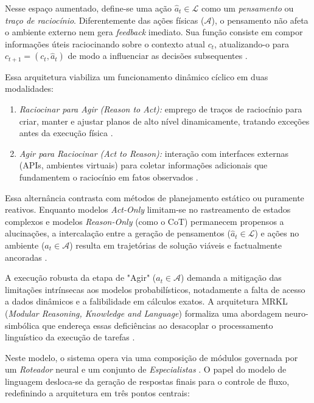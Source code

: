 \documentclass[
	12pt,				%
	openright,			%
	oneside,			%
	a4paper,			%
	dissertacao,			%
	]{ABNT-DC-UEL}
\begin{document}
Nesse espaço aumentado, define-se uma ação $\hat{a}_{t} \in \mathcal{L}$ como um \textit{pensamento} ou \textit{traço de raciocínio}. Diferentemente das ações físicas ($\mathcal{A}$), o pensamento não afeta o ambiente externo nem gera \textit{feedback} imediato. Sua função consiste em compor informações úteis raciocinando sobre o contexto atual $c_{t}$, atualizando-o para $c_{t+1} = (c_{t}, \hat{a}_{t})$ de modo a influenciar as decisões subsequentes \cite{yao2023}.

Essa arquitetura viabiliza um funcionamento dinâmico cíclico em duas modalidades:
\begin{enumerate}
  \item \textit{Raciocinar para Agir (Reason to Act):} emprego de traços de raciocínio para criar, manter e ajustar planos de alto nível dinamicamente, tratando exceções antes da execução física \cite{yao2023}.
  \item \textit{Agir para Raciocinar (Act to Reason):} interação com interfaces externas (APIs, ambientes virtuais) para coletar informações adicionais que fundamentem o raciocínio em fatos observados \cite{yao2023}.
\end{enumerate}

Essa alternância contrasta com métodos de planejamento estático ou puramente reativos. Enquanto modelos \textit{Act-Only} limitam-se no rastreamento de estados complexos e modelos \textit{Reason-Only} (como o CoT) permanecem propensos a alucinações, a intercalação entre a geração de pensamentos ($\hat{a}_{t} \in \mathcal{L}$) e ações no ambiente ($a_{t} \in \mathcal{A}$) resulta em trajetórias de solução viáveis e factualmente ancoradas \cite{yao2023}.

A execução robusta da etapa de "Agir" ($a_{t} \in \mathcal{A}$) demanda a mitigação das limitações intrínsecas aos modelos probabilísticos, notadamente a falta de acesso a dados dinâmicos e a falibilidade em cálculos exatos. A arquitetura MRKL (\textit{Modular Reasoning, Knowledge and Language}) formaliza uma abordagem neuro-simbólica que endereça essas deficiências ao desacoplar o processamento linguístico da execução de tarefas \cite{karpas2022}.

Neste modelo, o sistema opera via uma composição de módulos governada por um \textit{Roteador} neural e um conjunto de \textit{Especialistas} \cite{karpas2022}. O papel do modelo de linguagem desloca-se da geração de respostas finais para o controle de fluxo, redefinindo a arquitetura em três pontos centrais:
\end{document}
